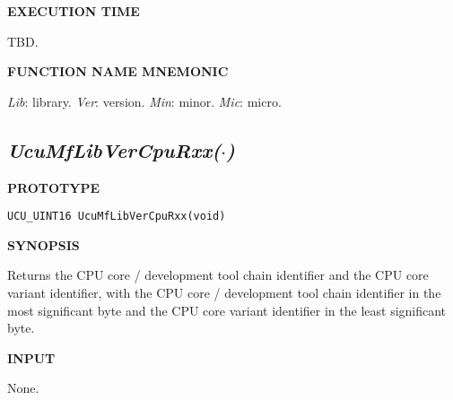 \noindent\textbf{EXECUTION TIME}
\begin{list}{}{\setlength{\leftmargin}{0.25in}\setlength{\topsep}{0.0in}}
\item TBD.
\end{list}
\vspace{2.8ex}

\noindent\textbf{FUNCTION NAME MNEMONIC}
\begin{list}{}{\setlength{\leftmargin}{0.25in}\setlength{\topsep}{0.0in}}
\item \emph{Lib}: library.  \emph{Ver}: version.  \emph{Min}: minor.
      \emph{Mic}: micro.
\end{list}


\subsection[\emph{UcuMfLibVerCpuRxx(\protect\mbox{\protect$\cdot$})}]
           {\emph{UcuMfLibVerCpuRxx(\protect\mbox{\protect\boldmath $\cdot$})}}
\label{cmsc0:slvc0}


\noindent\textbf{PROTOTYPE}
\begin {list}{}{\setlength{\leftmargin}{0.25in}\setlength{\topsep}{0.0in}}
\item
\begin{verbatim}
UCU_UINT16 UcuMfLibVerCpuRxx(void)
\end{verbatim}
\end{list}
\vspace{2.8ex}

\noindent\textbf{SYNOPSIS}
\begin{list}{}{\setlength{\leftmargin}{0.25in}\setlength{\topsep}{0.0in}}
\item Returns the CPU core / development tool chain identifier and the CPU core variant identifier,
      with the CPU core / development tool chain identifier in the most
      significant byte and the CPU core variant identifier in the least significant byte.
\end{list}
\vspace{2.8ex}

\noindent\textbf{INPUT}
\begin{list}{}{\setlength{\leftmargin}{0.5in}\setlength{\itemindent}{-0.25in}\setlength{\topsep}{0.0in}\setlength{\partopsep}{0.0in}}
\item None.
\end{list}
\vspace{2.8ex}

